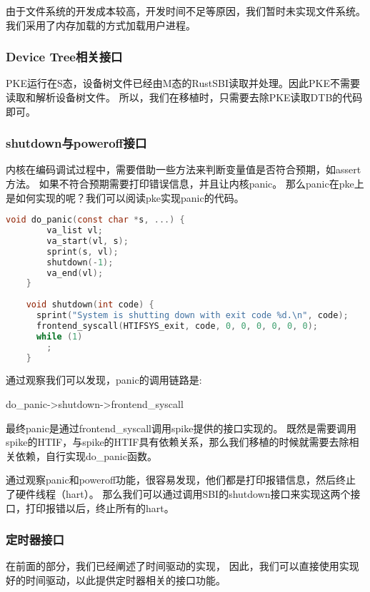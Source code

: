 由于文件系统的开发成本较高，开发时间不足等原因，我们暂时未实现文件系统。
我们采用了内存加载的方式加载用户进程。

\subsubsection{Device Tree相关接口}

PKE运行在S态，设备树文件已经由M态的RustSBI读取并处理。因此PKE不需要读取和解析设备树文件。
所以，我们在移植时，只需要去除PKE读取DTB的代码即可。

\subsubsection{shutdown与poweroff接口}

内核在编码调试过程中，需要借助一些方法来判断变量值是否符合预期，如assert方法。
如果不符合预期需要打印错误信息，并且让内核panic。
那么panic在pke上是如何实现的呢？我们可以阅读pke实现panic的代码。

\begin{lstlisting}[language=C, caption={panic实现代码}, label={lst:panic} ]
    void do_panic(const char *s, ...) {
        va_list vl;
        va_start(vl, s);
        sprint(s, vl);
        shutdown(-1);
        va_end(vl);
    }
    
    void shutdown(int code) {
      sprint("System is shutting down with exit code %d.\n", code);
      frontend_syscall(HTIFSYS_exit, code, 0, 0, 0, 0, 0, 0);
      while (1)
        ;
    }    
\end{lstlisting}

通过观察我们可以发现，panic的调用链路是:

do\_panic->shutdown->frontend\_syscall

最终panic是通过frontend\_syscall调用spike提供的接口实现的。
既然是需要调用spike的HTIF，与spike的HTIF具有依赖关系，那么我们移植的时候就需要去除相关依赖，自行实现do\_panic函数。

通过观察panic和poweroff功能，很容易发现，他们都是打印报错信息，然后终止了硬件线程（hart）。
那么我们可以通过调用SBI的shutdown接口来实现这两个接口，打印报错以后，终止所有的hart。

\subsubsection{定时器接口}

在前面的部分，我们已经阐述了时间驱动的实现，
因此，我们可以直接使用实现好的时间驱动，以此提供定时器相关的接口功能。


